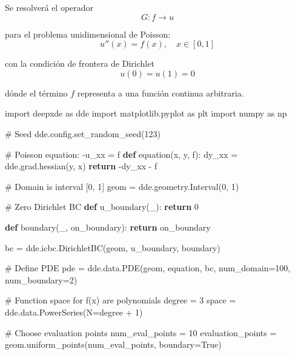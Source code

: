 \documentclass[
  spanish,
  us-letterpaper,
]{scrreprt}
\newenvironment{Shaded}{\begin{snugshade}}{\end{snugshade}}
\newcommand{\CommentTok}[1]{\textcolor[rgb]{0.37,0.37,0.37}{#1}}
\newcommand{\ControlFlowTok}[1]{\textcolor[rgb]{0.00,0.23,0.31}{\textbf{#1}}}
\newcommand{\DecValTok}[1]{\textcolor[rgb]{0.68,0.00,0.00}{#1}}
\newcommand{\ImportTok}[1]{\textcolor[rgb]{0.00,0.46,0.62}{#1}}
\newcommand{\KeywordTok}[1]{\textcolor[rgb]{0.00,0.23,0.31}{\textbf{#1}}}
\newcommand{\NormalTok}[1]{\textcolor[rgb]{0.00,0.23,0.31}{#1}}
\newcommand{\OperatorTok}[1]{\textcolor[rgb]{0.37,0.37,0.37}{#1}}
\newcommand{\VariableTok}[1]{\textcolor[rgb]{0.07,0.07,0.07}{#1}}
\theoremstyle{definition}
\theoremstyle{plain}
\theoremstyle{remark}
\begin{document}
Se resolverá el operador \[
G: f\rightarrow u
\]

para el problema unidimensional de Poisson: \[
u''(x) = f(x), \quad x\in[0,1]
\]

con la condición de frontera de Dirichlet \[
u(0)=u(1)=0
\]

dónde el término \(f\) representa a una función continua arbitraria.

\begin{Shaded}
\begin{Highlighting}[]
\ImportTok{import}\NormalTok{ deepxde }\ImportTok{as}\NormalTok{ dde}
\ImportTok{import}\NormalTok{ matplotlib.pyplot }\ImportTok{as}\NormalTok{ plt}
\ImportTok{import}\NormalTok{ numpy }\ImportTok{as}\NormalTok{ np}

\CommentTok{\# Seed}
\NormalTok{dde.config.set\_random\_seed(}\DecValTok{123}\NormalTok{)}

\CommentTok{\# Poisson equation: {-}u\_xx = f}
\KeywordTok{def}\NormalTok{ equation(x, y, f):}
\NormalTok{    dy\_xx }\OperatorTok{=}\NormalTok{ dde.grad.hessian(y, x)}
    \ControlFlowTok{return} \OperatorTok{{-}}\NormalTok{dy\_xx }\OperatorTok{{-}}\NormalTok{ f}

\CommentTok{\# Domain is interval [0, 1]}
\NormalTok{geom }\OperatorTok{=}\NormalTok{ dde.geometry.Interval(}\DecValTok{0}\NormalTok{, }\DecValTok{1}\NormalTok{)}

\CommentTok{\# Zero Dirichlet BC}
\KeywordTok{def}\NormalTok{ u\_boundary(\_):}
    \ControlFlowTok{return} \DecValTok{0}

\KeywordTok{def}\NormalTok{ boundary(\_, on\_boundary):}
    \ControlFlowTok{return}\NormalTok{ on\_boundary}

\NormalTok{bc }\OperatorTok{=}\NormalTok{ dde.icbc.DirichletBC(geom, u\_boundary, boundary)}

\CommentTok{\# Define PDE}
\NormalTok{pde }\OperatorTok{=}\NormalTok{ dde.data.PDE(geom, equation, bc, num\_domain}\OperatorTok{=}\DecValTok{100}\NormalTok{, num\_boundary}\OperatorTok{=}\DecValTok{2}\NormalTok{)}

\CommentTok{\# Function space for f(x) are polynomials}
\NormalTok{degree }\OperatorTok{=} \DecValTok{3}
\NormalTok{space }\OperatorTok{=}\NormalTok{ dde.data.PowerSeries(N}\OperatorTok{=}\NormalTok{degree }\OperatorTok{+} \DecValTok{1}\NormalTok{)}

\CommentTok{\# Choose evaluation points}
\NormalTok{num\_eval\_points }\OperatorTok{=} \DecValTok{10}
\NormalTok{evaluation\_points }\OperatorTok{=}\NormalTok{ geom.uniform\_points(num\_eval\_points, boundary}\OperatorTok{=}\VariableTok{True}\NormalTok{)}


\end{Highlighting}
\end{Shaded}
\end{document}
